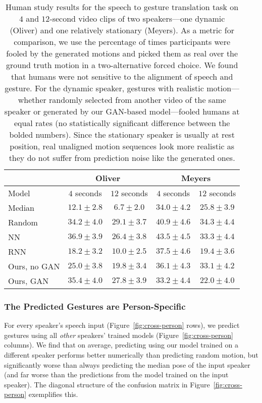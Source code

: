 \documentclass[10pt,twocolumn,letterpaper]{article}
\begin{document}
\begin{table}
\footnotesize
\centering
\setlength{\tabcolsep}{3pt}
\begin{tabular}{lcccc}
\toprule
 & \multicolumn{2}{c}{Oliver} & \multicolumn{2}{c}{Meyers} \tabularnewline
\midrule
Model & $4$ seconds & $12$ seconds & $4$ seconds & $12$ seconds \tabularnewline
\midrule
Median & $12.1 \pm 2.8$ &  $6.7 \pm 2.0$ &  $34.0 \pm 4.2$ & $25.8 \pm 3.9$\tabularnewline
\midrule
Random &  $\mathbf{34.2 \pm 4.0}$ & $\mathbf{29.1 \pm 3.7}$ & $\mathbf{40.9 \pm 4.6}$  & $\mathbf{34.3 \pm 4.4}$ \tabularnewline
NN~\cite{vggish} & $\mathbf{36.9 \pm 3.9}$ & $\mathbf{26.4 \pm 3.8}$ & $\mathbf{43.5 \pm 4.5}$  & $\mathbf{33.3 \pm 4.4}$  \tabularnewline
\midrule
RNN~\cite{shlizermanaudio} & $18.2 \pm 3.2$ & $10.0 \pm 2.5$ & $37.5 \pm 4.6$   & $19.4 \pm 3.6$ \tabularnewline
\midrule
Ours, no GAN & $25.0 \pm 3.8$ & $19.8 \pm 3.4$ & $36.1 \pm 4.3$  & $\mathbf{33.1 \pm 4.2}$ \tabularnewline
Ours, GAN & $\mathbf{35.4 \pm 4.0}$ & $\mathbf{27.8 \pm 3.9}$ & $33.2 \pm 4.4$  & $22.0 \pm 4.0$\tabularnewline
\bottomrule
\end{tabular}
\caption{Human study results for the speech to gesture translation task on $4$ and $12$-second video clips of two speakers---one dynamic (Oliver) and one relatively stationary (Meyers). As a metric for comparison, we use the percentage of times participants were fooled by the generated motions and picked them as real over the ground truth motion in a two-alternative forced choice. We found that humans were not sensitive to the alignment of speech and gesture. For the dynamic speaker, gestures with realistic motion---whether randomly selected from another video of the same speaker or generated by our GAN-based model---fooled humans at equal rates (no statistically significant difference between the bolded numbers). Since the stationary speaker is usually at rest position, real unaligned motion sequences look more realistic as they do not suffer from prediction noise like the generated ones.
}
\label{tab-mturk}
\end{table}

\subsubsection{The Predicted Gestures are Person-Specific}
For every speaker's speech input (Figure~\ref{fig:cross-person} rows), we predict gestures using all \emph{other} speakers' trained models (Figure~\ref{fig:cross-person} columns). We find that on average, predicting using our model trained on a different speaker performs better numerically than predicting random motion, but significantly worse than always predicting the median pose of the input speaker (and far worse than the predictions from the model trained on the input speaker). The diagonal structure of the confusion matrix in Figure~\ref{fig:cross-person} exemplifies this.
\end{document}

